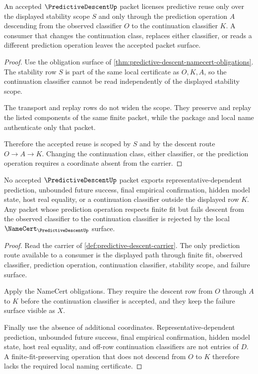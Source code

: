 \begin{theorem}
\label{thm:predictive-descent-stability-scope}
An accepted $\PredictiveDescentUp$ packet licenses predictive reuse only over the displayed stability scope $S$ and only through the prediction operation $A$ descending from the observed classifier $O$ to the continuation classifier $K$. A consumer that changes the continuation class, replaces either classifier, or reads a different prediction operation leaves the accepted packet surface.
\end{theorem}
\begin{proof}
Use the obligation surface of \autoref{thm:predictive-descent-namecert-obligations}. The stability row $S$ is part of the same local certificate as $O,K,A$, so the continuation classifier cannot be read independently of the displayed stability scope.

The transport and replay rows do not widen the scope. They preserve and replay the listed components of the same finite packet, while the package and local name authenticate only that packet.

Therefore the accepted reuse is scoped by $S$ and by the descent route $O \to A \to K$. Changing the continuation class, either classifier, or the prediction operation requires a coordinate absent from the carrier.
\end{proof}

\begin{theorem}
\label{thm:predictive-descent-nonescape}
No accepted $\PredictiveDescentUp$ packet exports representative-dependent prediction, unbounded future success, final empirical confirmation, hidden model state, host real equality, or a continuation classifier outside the displayed row $K$. Any packet whose prediction operation respects finite fit but fails descent from the observed classifier to the continuation classifier is rejected by the local $\NameCert_{\PredictiveDescentUp}$ surface.
\end{theorem}
\begin{proof}
Read the carrier of \autoref{def:predictive-descent-carrier}. The only prediction route available to a consumer is the displayed path through finite fit, observed classifier, prediction operation, continuation classifier, stability scope, and failure surface.

Apply the NameCert obligations. They require the descent row from $O$ through $A$ to $K$ before the continuation classifier is accepted, and they keep the failure surface visible as $X$.

Finally use the absence of additional coordinates. Representative-dependent prediction, unbounded future success, final empirical confirmation, hidden model state, host real equality, and off-row continuation classifiers are not entries of $D$. A finite-fit-preserving operation that does not descend from $O$ to $K$ therefore lacks the required local naming certificate.
\end{proof}

